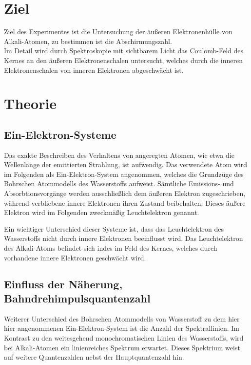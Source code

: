 \section*{Ziel}
Ziel des Experimentes ist die Untersuchung der äußeren Elektronenhülle von Alkali-Atomen, zu bestimmen ist die Abschirmungszahl.\\
Im Detail wird durch Spektroskopie mit sichtbarem Licht das Coulomb-Feld des Kernes an den äußeren Elektronenschalen untersucht,
welches durch die inneren Elektronenschalen von inneren Elektronen abgeschwächt ist.

\section{Theorie}
\label{sec:Theorie}
\subsection{Ein-Elektron-Systeme} %
\label{sub:1e}
Das exakte Beschreiben des Verhaltens von angeregten Atomen, wie etwa die Wellenlänge der emittierten Strahlung, ist aufwendig.
Das verwendete Atom wird im Folgenden als Ein-Elektron-System angenommen, welches die Grundzüge des Bohrschen Atommodells des Wasserstoffs aufweist.
Sämtliche Emissions- und Absorbtionsvorgänge werden ausschließlich dem äußeren Elektron zugeschrieben, während verbliebene innere Elektronen ihren Zustand beibehalten.
Dieses äußere Elektron wird im Folgenden zweckmäßig Leuchtelektron genannt.

Ein wichtiger Unterschied dieser Systeme ist, dass das Leuchtelektron des Wasserstoffs nicht durch innere Elektronen beeinflusst wird.
Das Leuchtelektron des Alkali-Atoms befindet sich indes im Feld des Kernes, welches durch vorhandene innere Elektronen geschwächt wird.

\subsection{Einfluss der Näherung, Bahndrehimpulsquantenzahl} %
\label{sub:L_quantenzahl}
Weiterer Unterschied des Bohrschen Atommodells von Wasserstoff zu dem hier hier angenommenen Ein-Elektron-System ist die Anzahl der Spektrallinien. 
Im Kontrast zu den weitesgehend monochromatischen Linien des Wasserstoffs, wird bei Alkali-Atomen ein linienreiches Spektrum erwartet.
Dieses Spektrium weist auf weitere Quantenzahlen nebst der Hauptquantenzahl hin.

